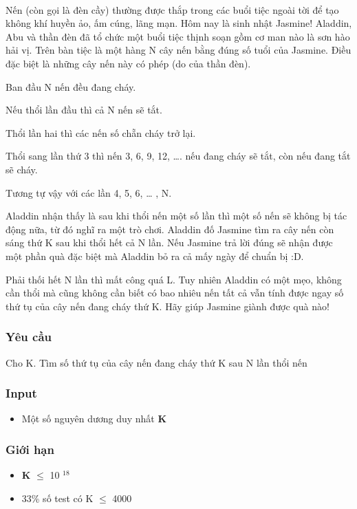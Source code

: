 

 

Nến (còn gọi là đèn cầy) thường được thắp trong các buổi tiệc ngoài tời để tạo không khí huyền ảo, ấm cúng, lãng mạn. Hôm nay là sinh nhật Jasmine! Aladdin, Abu và thần đèn đã tổ chức một buổi tiệc thịnh soạn gồm cơ man nào là sơn hào hải vị. Trên bàn tiệc là một hàng N cây nến bằng đúng số tuổi của Jasmine. Điều đặc biệt là những cây nến này có phép (do của thần đèn).

Ban đầu N nến đều đang cháy.

Nếu thổi lần đầu thì cả N nến sẽ tắt.

Thổi lần hai thì các nến số chẵn cháy trở lại.

Thổi sang lần thứ 3 thì nến 3, 6, 9, 12, …. nếu đang cháy sẽ tắt, còn nếu đang tắt sẽ cháy.

Tương tự vậy với các lần 4, 5, 6, … , N.

Aladdin nhận thấy là sau khi thổi nến một số lần thì một số nến sẽ không bị tác động nữa, từ đó nghĩ ra một trò chơi. Aladdin đố Jasmine tìm ra cây nến còn sáng thứ K sau khi thổi hết cả N lần. Nếu Jasmine trả lời đúng sẽ nhận được một phần quà đặc biệt mà Aladdin bỏ ra cả mấy ngày để chuẩn bị :D.

Phải thối hết N lần thì mất công quá L. Tuy nhiên Aladdin có một mẹo, không cần thổi mà cũng không cần biết có bao nhiêu nến tất cả vẫn tính được ngay số thứ tụ của cây nến đang cháy thứ K. Hãy giúp Jasmine giành được quà nào!

\subsubsection{Yêu cầu}

Cho K. Tìm số thứ tụ của cây nến đang cháy thứ K sau N lần thổi nến

\subsubsection{Input}
\begin{itemize}
	\item Một số nguyên dương duy nhất \textbf{ K }
\end{itemize}

\subsubsection{Giới hạn}
\begin{itemize}
	\item \textbf{K }  $\le$  10 $^ 18 $
	\item 33\% số test có K  $\le$  4000
\end{itemize}

